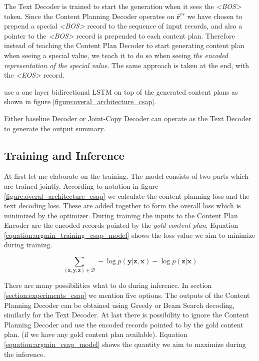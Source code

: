 The Text Decoder is trained to start the generation when it sees the \emph{\textless BOS\textgreater} token. Since the Content Planning Decoder operates on $\hat{\boldsymbol{r}}^{cs}$ we have chosen to prepend a special \emph{\textless BOS\textgreater} record to the sequence of input records, and also a pointer to the \emph{\textless BOS\textgreater} record is prepended to each content plan. Therefore instead of teaching the Content Plan Decoder to start generating content plan when seeing a special value, we teach it to do so when seeing \emph{the encoded representation of the special value}. The same approach is taken at the end, with the \emph{\textless EOS\textgreater} record.

\citet{puduppully2019datatotext} use a one layer bidirectional LSTM on top of the generated content plans as shown in figure \ref{figure:overal_architecture_csap}.

Either baseline Decoder or Joint-Copy Decoder can operate as the Text Decoder to generate the output summary.

\subsection{Training and Inference}

At first let me elaborate on the training. The model consists of two parts which are trained jointly. According to notation in figure \ref{figure:overal_architecture_csap} we calculate the content planning loss and the text decoding loss. These are added together to form the overall loss which is minimized by the optimizer. During training the inputs to the Content Plan Encoder are the encoded records pointed by the \emph{gold content plan}. Equation \ref{equation:argmin_training_csap_model} shows the loss value we aim to minimize during training.

\begin{equation} \label{equation:argmin_training_csap_model}
    \sum_{(\boldsymbol{x}, \boldsymbol{y}, \boldsymbol{z}) \in \mathcal{D}} - \log{p(\boldsymbol{y}|\boldsymbol{z}, \boldsymbol{x})} - \log{p(\boldsymbol{z} | \boldsymbol{x})}
\end{equation}

There are many possibilities what to do during inference. In section \ref{section:experiments_csap} we mention five options. The outputs of the Content Planning Decoder can be obtained using Greedy or Beam Search decoding, similarly for the Text Decoder. At last there is possibility to ignore the Content Planning Decoder and use the encoded records pointed to by the gold content plan. (if we have any gold content plan available). Equation \ref{equation:argmin_csap_model} shows the quantity we aim to maximize during the inference.

